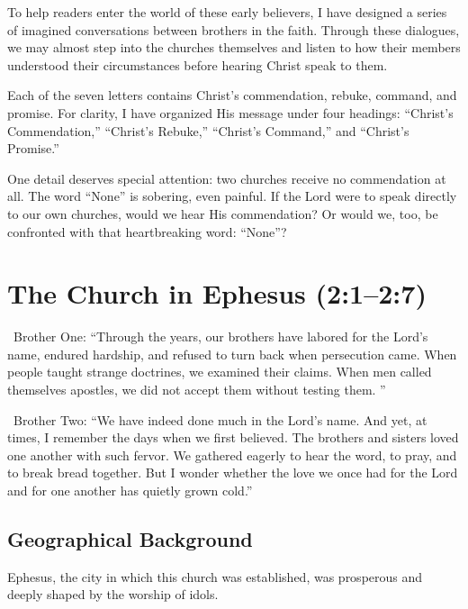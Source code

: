 To help readers enter the world of these early believers, I have designed a series of imagined conversations between brothers in the faith. Through these dialogues, we may almost step into the churches themselves and listen to how their members understood their circumstances before hearing Christ speak to them.

Each of the seven letters contains Christ's commendation, rebuke, command, and promise. For clarity, I have organized His message under four headings: ``Christ's Commendation,'' ``Christ's Rebuke,'' ``Christ's Command,'' and ``Christ's Promise.''

One detail deserves special attention: two churches receive no commendation at all. The word ``None'' is sobering, even painful. If the Lord were to speak directly to our own churches, would we hear His commendation? Or would we, too, be confronted with that heartbreaking word: ``None''?

\section{The Church in Ephesus (2:1--2:7)}

\begin{DialogueBox}
\noindent\faUser\ Brother One: ``Through the years, our brothers have labored for the Lord's name, endured hardship, and refused to turn back when persecution came. When people taught strange doctrines, we examined their claims. When men called themselves apostles, we did not accept them without testing them. ''

\vspace{0.1cm}

\noindent\faUser\ Brother Two: ``We have indeed done much in the Lord's name. And yet, at times, I remember the days when we first believed. The brothers and sisters loved one another with such fervor. We gathered eagerly to hear the word, to pray, and to break bread together. But I wonder whether the love we once had for the Lord and for one another has quietly grown cold.''
\end{DialogueBox}

\subsection{Geographical Background}

Ephesus, the city in which this church was established, was prosperous and deeply shaped by the worship of idols.

